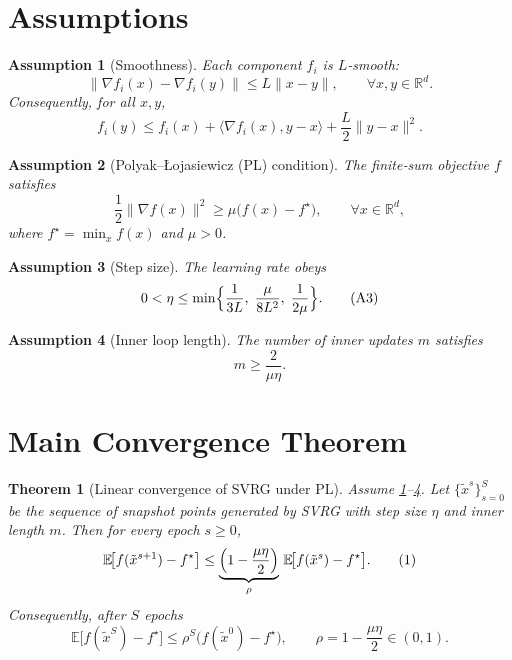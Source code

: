 \documentclass{article}
\newtheorem{theorem}{Theorem}
\newtheorem{assumption}{Assumption}
\newcommand{\E}{\mathbb{E}}
\newcommand{\R}{\mathbb{R}}
\begin{document}
\section*{Assumptions}
\begin{assumption}[Smoothness]\label{ass:smooth}
Each component $f_i$ is $L$‑smooth:
\[
\|\nabla f_i(x)-\nabla f_i(y)\|\le L\|x-y\|,\qquad\forall x,y\in\R^{d}.
\]
Consequently, for all $x,y$,
\[
f_i(y)\le f_i(x)+\langle\nabla f_i(x),y-x\rangle+\frac{L}{2}\|y-x\|^{2}.
\tag{A1}
\]
\end{assumption}

\begin{assumption}[Polyak–Łojasiewicz (PL) condition]\label{ass:pl}
The finite‑sum objective $f$ satisfies
\[
\frac{1}{2}\|\nabla f(x)\|^{2}\ge \mu\bigl(f(x)-f^{\star}\bigr),\qquad\forall x\in\R^{d},
\tag{A2}
\]
where $f^{\star}= \min_{x}f(x)$ and $\mu>0$.
\end{assumption}

\begin{assumption}[Step size]\label{ass:step}
The learning rate obeys
\[
0<\eta\le \min\Bigl\{\frac{1}{3L},\;\frac{\mu}{8L^{2}},\;\frac{1}{2\mu}\Bigr\}.
\tag{A3}
\]
\end{assumption}

\begin{assumption}[Inner loop length]\label{ass:inner}
The number of inner updates $m$ satisfies
\[
m\ge \frac{2}{\mu\eta}.
\tag{A4}
\]
\end{assumption}

\section*{Main Convergence Theorem}
\begin{theorem}[Linear convergence of SVRG under PL]\label{thm:linear}
Assume \ref{ass:smooth}–\ref{ass:inner}. Let $\{ \tilde{x}^{s}\}_{s=0}^{S}$ be the sequence of snapshot points generated by SVRG with step size $\eta$ and inner length $m$. Then for every epoch $s\ge 0$,
\[
\E\!\bigl[ f(\tilde{x}^{s+1})-f^{\star}\bigr]\le
\underbrace{\Bigl(1-\frac{\mu\eta}{2}\Bigr)}_{\rho}\,
\E\!\bigl[ f(\tilde{x}^{s})-f^{\star}\bigr].
\tag{1}
\]
Consequently, after $S$ epochs
\[
\E\!\bigl[ f(\tilde{x}^{S})-f^{\star}\bigr]\le \rho^{S}\bigl(f(\tilde{x}^{0})-f^{\star}\bigr),
\qquad \rho=1-\frac{\mu\eta}{2}\in(0,1).
\tag{2}
\]
\end{theorem}
\end{document}
